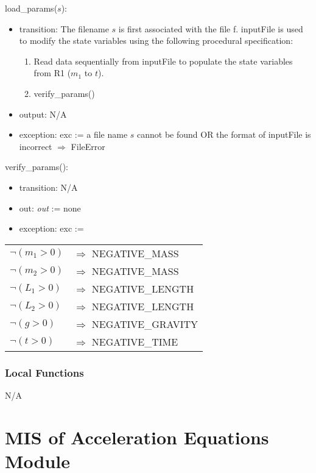 \documentclass[12pt, titlepage]{article}
\begin{document}
\noindent load\_params($s$):
\begin{itemize}
\item transition: The filename $s$ is first associated with the file f.  {inputFile} is used to
  modify the state variables using the following procedural specification:
\begin{enumerate}
\item Read data sequentially from inputFile to populate the state variables from
  R1 ($m_1$ to $\mathit{t}$).


\item verify\_params()


\end{enumerate}
\item output: N/A
\item exception: exc := a file name $s$ cannot be found OR the format of
  inputFile is incorrect $\Rightarrow$  FileError
\end{itemize}

\noindent verify\_params():
\begin{itemize}
\item transition: N/A
\item out: \textit{out} := none
\item exception: exc := 
\end{itemize}
\noindent \begin{longtable*}[l]{l l} 
$\neg (m_1 > 0)$ & $\Rightarrow$ NEGATIVE\_MASS\\
$\neg (m_2 > 0)$ & $\Rightarrow$ NEGATIVE\_MASS\\
$\neg (L_1 > 0)$ & $\Rightarrow$ NEGATIVE\_LENGTH\\
$\neg (L_2 > 0)$ & $\Rightarrow$ NEGATIVE\_LENGTH\\
$\neg (g > 0)$ & $\Rightarrow$ NEGATIVE\_GRAVITY\\
$\neg (t > 0)$ & $\Rightarrow$ NEGATIVE\_TIME\\
\end{longtable*}

\subsubsection{Local Functions}
N/A

\newpage


\section{MIS of Acceleration Equations Module} \label{AEModule} 
 
\end{document}
